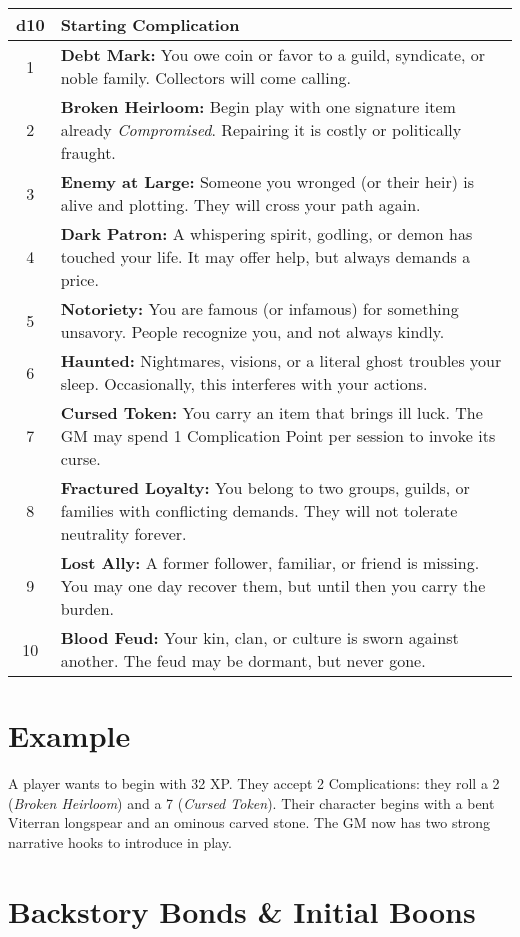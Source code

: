 \documentclass[12pt]{article}
\begin{document}
\begin{tabular}{|c|p{10cm}|}
\hline
\textbf{d10} & \textbf{Starting Complication} \\
\hline
1 & \textbf{Debt Mark:} You owe coin or favor to a guild, syndicate, or noble family. Collectors will come calling. \\
\hline
2 & \textbf{Broken Heirloom:} Begin play with one signature item already \emph{Compromised}. Repairing it is costly or politically fraught. \\
\hline
3 & \textbf{Enemy at Large:} Someone you wronged (or their heir) is alive and plotting. They will cross your path again. \\
\hline
4 & \textbf{Dark Patron:} A whispering spirit, godling, or demon has touched your life. It may offer help, but always demands a price. \\
\hline
5 & \textbf{Notoriety:} You are famous (or infamous) for something unsavory. People recognize you, and not always kindly. \\
\hline
6 & \textbf{Haunted:} Nightmares, visions, or a literal ghost troubles your sleep. Occasionally, this interferes with your actions. \\
\hline
7 & \textbf{Cursed Token:} You carry an item that brings ill luck. The GM may spend 1 Complication Point per session to invoke its curse. \\
\hline
8 & \textbf{Fractured Loyalty:} You belong to two groups, guilds, or families with conflicting demands. They will not tolerate neutrality forever. \\
\hline
9 & \textbf{Lost Ally:} A former follower, familiar, or friend is missing. You may one day recover them, but until then you carry the burden. \\
\hline
10 & \textbf{Blood Feud:} Your kin, clan, or culture is sworn against another. The feud may be dormant, but never gone. \\
\hline
\end{tabular}

\section{Example}
A player wants to begin with 32 XP.  
They accept 2 Complications: they roll a 2 (\emph{Broken Heirloom}) and a 7 (\emph{Cursed Token}).  
Their character begins with a bent Viterran longspear and an ominous carved stone.  
The GM now has two strong narrative hooks to introduce in play.

\section*{Backstory Bonds \& Initial Boons}
\end{document}
